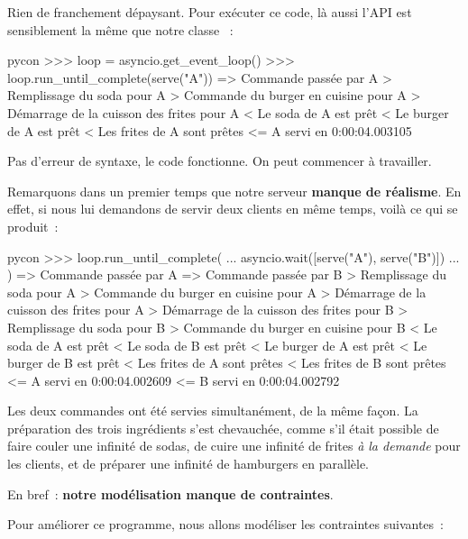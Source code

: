 \documentclass[small]{zmdocument}
\begin{document}
Rien de franchement dépaysant.
Pour exécuter ce code, là aussi l’API est sensiblement la même que notre classe  :



\begin{CodeBlock}{pycon}
>>> loop = asyncio.get_event_loop()
>>> loop.run_until_complete(serve("A"))
=> Commande passée par A
    > Remplissage du soda pour A
    > Commande du burger en cuisine pour A
    > Démarrage de la cuisson des frites pour A
    < Le soda de A est prêt
    < Le burger de A est prêt
    < Les frites de A sont prêtes
<= A servi en 0:00:04.003105
\end{CodeBlock}



Pas d’erreur de syntaxe, le code fonctionne. On peut commencer à travailler.



Remarquons dans un premier temps que notre serveur \textbf{manque de réalisme}. En
effet, si nous lui demandons de servir deux clients en même temps, voilà ce qui
se produit :



\begin{CodeBlock}{pycon}
>>> loop.run_until_complete(
...     asyncio.wait([serve("A"), serve("B")])
... )
=> Commande passée par A
=> Commande passée par B
    > Remplissage du soda pour A
    > Commande du burger en cuisine pour A
    > Démarrage de la cuisson des frites pour A
    > Démarrage de la cuisson des frites pour B
    > Remplissage du soda pour B
    > Commande du burger en cuisine pour B
    < Le soda de A est prêt
    < Le soda de B est prêt
    < Le burger de A est prêt
    < Le burger de B est prêt
    < Les frites de A sont prêtes
    < Les frites de B sont prêtes
<= A servi en 0:00:04.002609
<= B servi en 0:00:04.002792
\end{CodeBlock}



Les deux commandes ont été servies simultanément, de la même façon. La
préparation des trois ingrédients s’est chevauchée, comme s’il était possible
de faire couler une infinité de sodas, de cuire une infinité de
frites \textit{à la demande} pour les clients, et de préparer une infinité de
hamburgers en parallèle.



En bref : \textbf{notre modélisation manque de contraintes}.



Pour améliorer ce programme, nous allons modéliser les contraintes suivantes :
\end{document}
